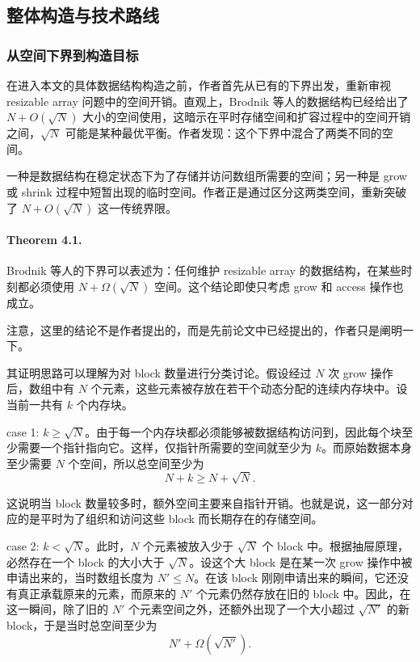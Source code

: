 \documentclass[12pt,a4paper]{article}
\begin{document}
\subsection{整体构造与技术路线}

\subsubsection{从空间下界到构造目标}

在进入本文的具体数据结构构造之前，作者首先从已有的下界出发，重新审视 resizable array 问题中的空间开销。直观上，Brodnik 等人的数据结构已经给出了 $N+O(\sqrt{N})$ 大小的空间使用，这暗示在平时存储空间和扩容过程中的空间开销之间，$\sqrt{N}$ 可能是某种最优平衡。作者发现：这个下界中混合了两类不同的空间。

一种是数据结构在稳定状态下为了存储并访问数组所需要的空间；另一种是 grow 或 shrink 过程中短暂出现的临时空间。作者正是通过区分这两类空间，重新突破了 $N+O(\sqrt{N})$ 这一传统界限。

\paragraph{Theorem 4.1.}

Brodnik 等人的下界可以表述为：任何维护 resizable array 的数据结构，在某些时刻都必须使用 $N+\Omega(\sqrt{N})$ 空间。这个结论即使只考虑 grow 和 access 操作也成立\cite{brodnik1999resizable,tarjan2023optimalresizablearrays}。

注意，这里的结论不是作者提出的，而是先前论文中已经提出的，作者只是阐明一下。

其证明思路可以理解为对 block 数量进行分类讨论。假设经过 $N$ 次 grow 操作后，数组中有 $N$ 个元素，这些元素被存放在若干个动态分配的连续内存块中。设当前一共有 $k$ 个内存块。

case 1: $k\ge \sqrt{N}$。由于每一个内存块都必须能够被数据结构访问到，因此每个块至少需要一个指针指向它。这样，仅指针所需要的空间就至少为 $k$。而原始数据本身至少需要 $N$ 个空间，所以总空间至少为
\[
N+k \ge N+\sqrt{N}.
\]

这说明当 block 数量较多时，额外空间主要来自指针开销。也就是说，这一部分对应的是平时为了组织和访问这些 block 而长期存在的存储空间。

case 2: $k<\sqrt{N}$。此时，$N$ 个元素被放入少于 $\sqrt{N}$ 个 block 中。根据抽屉原理，必然存在一个 block 的大小大于 $\sqrt{N}$。设这个大 block 是在某一次 grow 操作中被申请出来的，当时数组长度为 $N'\le N$。在该 block 刚刚申请出来的瞬间，它还没有真正承载原来的元素，而原来的 $N'$ 个元素仍然存放在旧的 block 中。因此，在这一瞬间，除了旧的 $N'$ 个元素空间之外，还额外出现了一个大小超过 $\sqrt{N'}$ 的新 block，于是当时总空间至少为
\[
N' + \Omega(\sqrt{N'}).
\]
\end{document}
